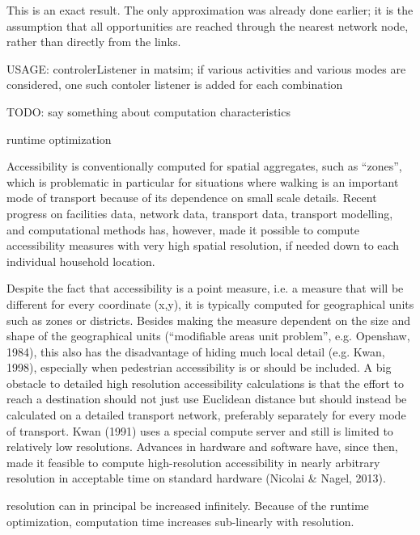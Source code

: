 This is an exact result. The only approximation was already done
earlier; it is the assumption that all opportunities are reached through the nearest network node, rather than directly from the links.



USAGE: controlerListener in \gls{matsim}; if various activities and various modes are considered, one such contoler listener 
is added for each combination


TODO: say something about computation characteristics

runtime optimization
%
%
%
%
%


Accessibility is conventionally computed for spatial aggregates, such as “zones”, which is problematic in particular 
for situations where walking is an important mode of transport because of its dependence on small scale details. Recent 
progress on facilities data, network data, transport data, transport modelling, and computational methods has, however, 
made it possible to compute accessibility measures with very high spatial resolution, if needed down to each individual 
household location.


Despite the fact that accessibility is a point measure, i.e. a measure that will be different for every coordinate (x,y), it is typically computed for geographical units such as zones or districts. Besides making the measure dependent on the size and shape of the geographical units (“modifiable areas unit problem”, e.g. Openshaw, 1984), this also has the disadvantage of hiding much local detail (e.g. Kwan, 1998), especially when pedestrian accessibility is or should be included.
A big obstacle to detailed high resolution accessibility calculations is that the effort to reach a destination should not just use Euclidean distance but should instead be calculated on a detailed transport network, preferably separately for every mode of transport. Kwan (1991) uses a special compute server and still is limited to relatively low resolutions. Advances in hardware and software have, since then, made it feasible to compute high-resolution accessibility in nearly arbitrary resolution in acceptable time on standard hardware (Nicolai \& Nagel, 2013).



resolution can in principal be increased infinitely. Because of the runtime optimization, computation time increases 
sub-linearly with resolution.

